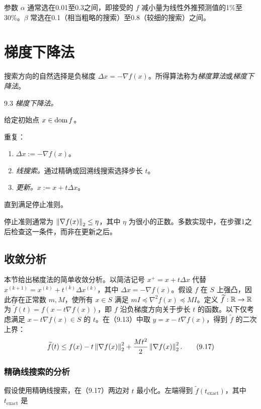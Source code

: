 参数 $\alpha$ 通常选在0.01至0.3之间，即接受的 $f$ 减小量为线性外推预测值的1\%至30\%。$\beta$ 常选在0.1（相当粗略的搜索）至0.8（较细的搜索）之间。

\section{梯度下降法}
搜索方向的自然选择是负梯度 $\Delta x=-\nabla f(x)$。所得算法称为\emph{梯度算法}或\emph{梯度下降法}。

\begin{origalgorithm}{9.3}
\emph{梯度下降法。}

给定初始点 $x\in\operatorname{dom} f$。

重复：
\begin{enumerate}
\item $\Delta x:=-\nabla f(x)$。
\item \emph{线搜索。}通过精确或回溯线搜索选择步长 $t$。
\item \emph{更新。}$x:=x+t\Delta x$。
\end{enumerate}
直到满足停止准则。
\end{origalgorithm}

停止准则通常为 $\left\lVert \nabla f(x)\right\rVert_2\le\eta$，其中 $\eta$ 为很小的正数。多数实现中，在步骤1之后检查这一条件，而非在更新之后。

\subsection{收敛分析}
本节给出梯度法的简单收敛分析。以简洁记号 $x^+=x+t\Delta x$ 代替
$x^{(k+1)}=x^{(k)}+t^{(k)}\Delta x^{(k)}$，其中 $\Delta x=-\nabla f(x)$。假设 $f$ 在 $S$ 上强凸，因此存在正常数 $m,M$，使所有 $x\in S$ 满足 $mI\preceq\nabla^2f(x)\preceq MI$。定义 $\widetilde f:\mathbb R\to\mathbb R$ 为
$\widetilde f(t)=f(x-t\nabla f(x))$，即 $f$ 沿负梯度方向关于步长 $t$ 的函数。以下仅考虑满足 $x-t\nabla f(x)\in S$ 的 $t$。在（9.13）中取 $y=x-t\nabla f(x)$，得到 $\widetilde f$ 的二次上界：
\begin{equation}
\widetilde f(t)\le f(x)-t\left\lVert \nabla f(x)\right\rVert_2^2
+\frac{Mt^2}{2}\left\lVert \nabla f(x)\right\rVert_2^2.\tag{9.17}
\end{equation}

\subsubsection*{精确线搜索的分析}
假设使用精确线搜索，在（9.17）两边对 $t$ 最小化。左端得到 $\widetilde f(t_{\mathrm{exact}})$，其中 $t_{\mathrm{exact}}$ 是
